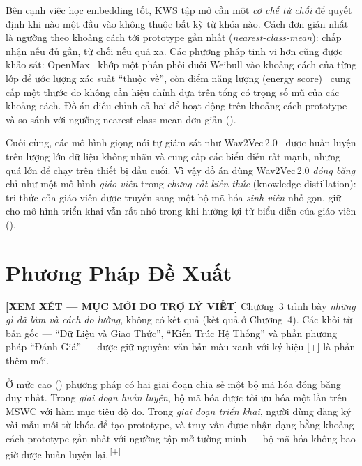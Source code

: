 \documentclass[12pt,a4paper]{report}
\newcommand{\NEW}[1]{{\color{addcolor}#1\,\textsuperscript{\tiny[+]}}}
\newcommand{\reviewnote}[1]{%
    \par\smallskip\noindent
    \colorbox{yellow!35}{\parbox{0.97\linewidth}{\small\textbf{[XEM XÉT — MỤC MỚI DO TRỢ LÝ VIẾT]}\; #1}}%
    \par\smallskip}
\newcommand{\NEW}[1]{#1}
\newcommand{\reviewnote}[1]{}
\begin{document}
Bên cạnh việc học embedding tốt, KWS tập mở cần một \emph{cơ chế từ chối} để quyết
định khi nào một đầu vào không thuộc bất kỳ từ khóa nào. Cách đơn giản nhất là
ngưỡng theo khoảng cách tới prototype gần nhất (\emph{nearest-class-mean}): chấp
nhận nếu đủ gần, từ chối nếu quá xa. Các phương pháp tinh vi hơn cũng được khảo
sát: OpenMax~\cite{bendale2016openmax} khớp một phân phối đuôi Weibull vào khoảng
cách của từng lớp để ước lượng xác suất ``thuộc về'', còn điểm năng lượng
(energy score)~\cite{liu2020energy} cung cấp một thước đo không cần hiệu chỉnh dựa
trên tổng có trọng số mũ của các khoảng cách. Đồ án điều chỉnh cả hai để hoạt động
trên khoảng cách prototype và so sánh với ngưỡng nearest-class-mean đơn giản
().

Cuối cùng, các mô hình giọng nói tự giám sát như Wav2Vec\,2.0~\cite{baevski2020wav2vec}
được huấn luyện trên lượng lớn dữ liệu không nhãn và cung cấp các biểu diễn rất
mạnh, nhưng quá lớn để chạy trên thiết bị đầu cuối. Vì vậy đồ án dùng Wav2Vec\,2.0
\emph{đóng băng} chỉ như một mô hình \emph{giáo viên} trong \emph{chưng cất kiến
thức} (knowledge distillation): tri thức của giáo viên được truyền sang một bộ mã
hóa \emph{sinh viên} nhỏ gọn, giữ cho mô hình triển khai vẫn rất nhỏ trong khi
hưởng lợi từ biểu diễn của giáo viên ().

\chapter{Phương Pháp Đề Xuất}\label{ch:method}
\reviewnote{Chương~3 trình bày \emph{những gì đã làm và cách đo lường}, không có
kết quả (kết quả ở Chương~4). Các khối từ bản gốc --- ``Dữ Liệu và Giao Thức'',
``Kiến Trúc Hệ Thống'' và phần phương pháp ``Đánh Giá'' --- được giữ nguyên; văn
bản \textcolor{addcolor}{màu xanh với ký hiệu [+]} là phần thêm mới.}

\NEW{Ở mức cao () phương pháp có hai giai đoạn chia sẻ một bộ
mã hóa đóng băng duy nhất. Trong \emph{giai đoạn huấn luyện}, bộ mã hóa được tối
ưu hóa một lần trên MSWC với hàm mục tiêu độ đo. Trong \emph{giai đoạn triển
khai}, người dùng đăng ký vài mẫu mỗi từ khóa để tạo prototype, và truy vấn được
nhận dạng bằng khoảng cách prototype gần nhất với ngưỡng tập mở tường minh ---
bộ mã hóa không bao giờ được huấn luyện lại.}
\end{document}
